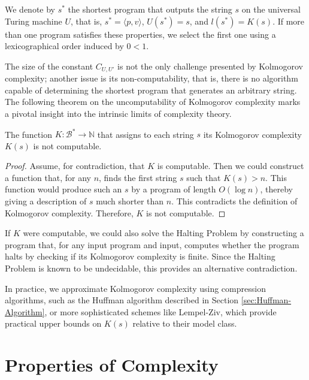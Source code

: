 \begin{notation}
We denote by \(s^\ast\) the shortest program that outputs the string \(s\) on the universal Turing machine \(U\), that is, \(s^\ast = \langle p,v \rangle\), \(U(s^\ast) = s\), and \(l(s^\ast) = K(s)\). If more than one program satisfies these properties, we select the first one using a lexicographical order induced by \(0 < 1\).
\end{notation}

The size of the constant \(C_{U, U'}\) is not the only challenge presented by Kolmogorov complexity; another issue is its non-computability, that is, there is no algorithm capable of determining the shortest program that generates an arbitrary string. The following theorem on the uncomputability of Kolmogorov complexity marks a pivotal insight into the intrinsic limits of complexity theory.

\begin{theorem}
The function \(K: \mathcal{B}^\ast \rightarrow \mathbb{N}\) that assigns to each string \(s\) its Kolmogorov complexity \(K(s)\) is not computable.
\end{theorem}
\begin{proof}
Assume, for contradiction, that \(K\) is computable. Then we could construct a function that, for any $n$, finds the first string $s$ such that $K(s) > n$. This function would produce such an $s$ by a program of length $O(\log n)$, thereby giving a description of $s$ much shorter than $n$. This contradicts the definition of Kolmogorov complexity. Therefore, $K$ is not computable.
\end{proof}

If \(K\) were computable, we could also solve the Halting Problem by constructing a program that, for any input program and input, computes whether the program halts by checking if its Kolmogorov complexity is finite. Since the Halting Problem is known to be undecidable, this provides an alternative contradiction.

In practice, we approximate Kolmogorov complexity using compression algorithms, such as the Huffman algorithm described in Section \ref{sec:Huffman-Algorithm}, or more sophisticated schemes like Lempel-Ziv, which provide practical upper bounds on $K(s)$ relative to their model class.

%
%

\section{Properties of Complexity}

